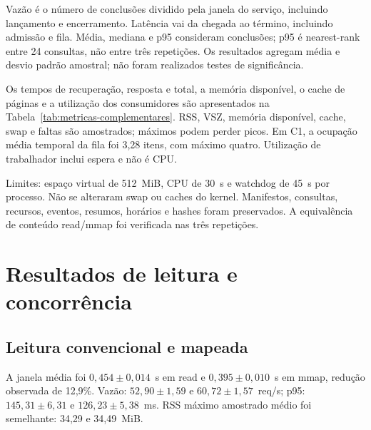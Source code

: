 \documentclass[12pt,a4paper]{article}
\newcommand{\secao}[1]{\clearpage\section{#1}}
\begin{document}
  Vazão é o número de conclusões dividido pela janela do serviço, incluindo lançamento e encerramento. Latência vai da chegada ao término, incluindo admissão e fila. Média, mediana e p95 consideram conclusões; p95 é nearest-rank entre 24 consultas, não entre três repetições. Os resultados agregam média e desvio padrão amostral; não foram realizados testes de significância.
  
  Os tempos de recuperação, resposta e total, a memória disponível, o cache de páginas e a utilização dos consumidores são apresentados na Tabela~\ref{tab:metricas-complementares}. RSS, VSZ, memória disponível, cache, swap e faltas são amostrados; máximos podem perder picos. Em C1, a ocupação média temporal da fila foi 3,28 itens, com máximo quatro. Utilização de trabalhador inclui espera e não é CPU.
  
  Limites: espaço virtual de 512~MiB, CPU de 30~s e watchdog de 45~s por processo. Não se alteraram swap ou caches do kernel. Manifestos, consultas, recursos, eventos, resumos, horários e hashes foram preservados. A equivalência de conteúdo read/mmap foi verificada nas três repetições.
  
  \secao{Resultados de leitura e concorrência}
  \subsection{Leitura convencional e mapeada}
  A janela média foi $0{,}454\pm0{,}014$~s em read e $0{,}395\pm0{,}010$~s em mmap, redução observada de 12,9\%. Vazão: $52{,}90\pm1{,}59$ e $60{,}72\pm1{,}57$~req/s; p95: $145{,}31\pm6{,}31$ e $126{,}23\pm5{,}38$~ms. RSS máximo amostrado médio foi semelhante: 34,29 e 34,49~MiB.
  
\end{document}
